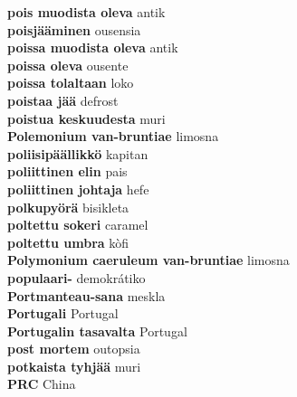 \textbf{ pois muodista oleva  } antik \\
\textbf{ poisjääminen  } ousensia \\
\textbf{ poissa muodista oleva  } antik \\
\textbf{ poissa oleva  } ousente \\
\textbf{ poissa tolaltaan  } loko \\
\textbf{ poistaa jää  } defrost \\
\textbf{ poistua keskuudesta  } muri \\
\textbf{ Polemonium van-bruntiae  } limosna \\
\textbf{ poliisipäällikkö  } kapitan \\
\textbf{ poliittinen elin  } pais \\
\textbf{ poliittinen johtaja  } hefe \\
\textbf{ polkupyörä  } bisikleta \\
\textbf{ poltettu sokeri  } caramel \\
\textbf{ poltettu umbra  } kòfi \\
\textbf{ Polymonium caeruleum van-bruntiae  } limosna \\
\textbf{ populaari-  } demokrátiko \\
\textbf{ Portmanteau-sana  } meskla \\
\textbf{ Portugali  } Portugal \\
\textbf{ Portugalin tasavalta  } Portugal \\
\textbf{ post mortem  } outopsia \\
\textbf{ potkaista tyhjää  } muri \\
\textbf{ PRC  } China \\
